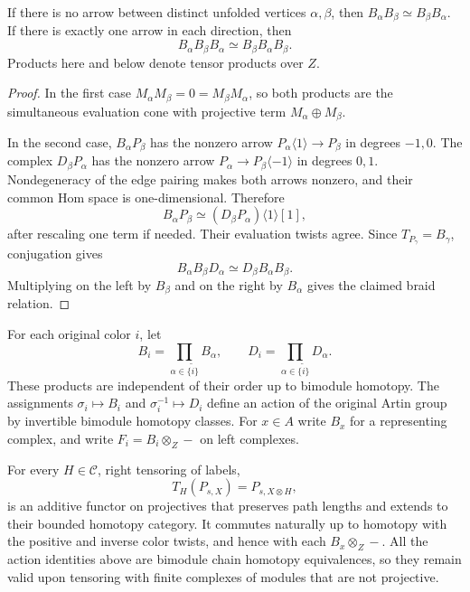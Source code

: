 \begin{lemma}
\label{lem:category-local-braid}
If there is no arrow between distinct unfolded vertices $\alpha,\beta$,
then $B_\alpha B_\beta\simeq B_\beta B_\alpha$. If there is exactly
one arrow in each direction, then
\[
 B_\alpha B_\beta B_\alpha
       \simeq B_\beta B_\alpha B_\beta.
\]
Products here and below denote tensor products over $Z$.
\end{lemma}

\begin{proof}
In the first case $M_\alpha M_\beta=0=M_\beta M_\alpha$, so both
products are the simultaneous evaluation cone with projective term
$M_\alpha\oplus M_\beta$.

In the second case, $B_\alpha P_\beta$ has the nonzero arrow
$P_\alpha\langle1\rangle\to P_\beta$ in degrees $-1,0$.
The complex $D_\beta P_\alpha$ has the nonzero arrow
$P_\alpha\to P_\beta\langle-1\rangle$ in degrees $0,1$.
Nondegeneracy of the edge pairing makes both arrows nonzero, and
their common Hom space is one-dimensional. Therefore
\[
 B_\alpha P_\beta\simeq
       (D_\beta P_\alpha)\langle1\rangle[1],
\]
after rescaling one term if needed. Their evaluation twists agree.
Since $T_{P_\gamma}=B_\gamma$, conjugation gives
\[
 B_\alpha B_\beta D_\alpha
       \simeq D_\beta B_\alpha B_\beta.
\]
Multiplying on the left by $B_\beta$ and on the right by $B_\alpha$
gives the claimed braid relation.
\end{proof}

\begin{proposition}
\label{prop:twist-action}
For each original color $i$, let
\[
 B_i=\prod_{\alpha\in\widetilde{\{i\}}}B_\alpha,
 \qquad
 D_i=\prod_{\alpha\in\widetilde{\{i\}}}D_\alpha.
\]
These products are independent of their order up to bimodule homotopy.
The assignments $\sigma_i\mapsto B_i$ and $\sigma_i^{-1}\mapsto D_i$
define an action of the original Artin group by invertible bimodule
homotopy classes. For $x\in A$ write $B_x$ for a representing complex,
and write $F_i=B_i\otimes_Z-$ on left complexes.

For every $H\in\mathscr C$, right tensoring of labels,
\[
 T_H(P_{s,X})=P_{s,X\otimes H},
\]
is an additive functor on projectives that preserves path lengths and
extends to their bounded homotopy category. It commutes naturally up
to homotopy with the positive and inverse color twists, and hence
with each $B_x\otimes_Z-$. All the action identities above are
bimodule chain homotopy equivalences, so they remain valid upon
tensoring with finite complexes of modules that are not projective.
\end{proposition}

